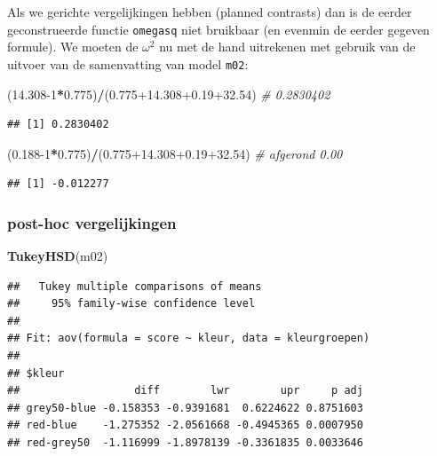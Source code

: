 \documentclass[
]{book}
\newenvironment{Shaded}{\begin{snugshade}}{\end{snugshade}}
\newcommand{\CommentTok}[1]{\textcolor[rgb]{0.56,0.35,0.01}{\textit{#1}}}
\newcommand{\DecValTok}[1]{\textcolor[rgb]{0.00,0.00,0.81}{#1}}
\newcommand{\FloatTok}[1]{\textcolor[rgb]{0.00,0.00,0.81}{#1}}
\newcommand{\KeywordTok}[1]{\textcolor[rgb]{0.13,0.29,0.53}{\textbf{#1}}}
\newcommand{\NormalTok}[1]{#1}
\newcommand{\OperatorTok}[1]{\textcolor[rgb]{0.81,0.36,0.00}{\textbf{#1}}}
\begin{document}
Als we gerichte vergelijkingen hebben (planned contrasts) dan is de eerder geconstrueerde functie \texttt{omegasq} niet bruikbaar (en evenmin de eerder gegeven formule). We moeten de \(\omega^2\) nu met de hand uitrekenen met gebruik van de uitvoer van de samenvatting van model \texttt{m02}:

\begin{Shaded}
\begin{Highlighting}[]
\NormalTok{(}\FloatTok{14.308}\DecValTok{{-}1}\OperatorTok{*}\FloatTok{0.775}\NormalTok{)}\OperatorTok{/}\NormalTok{(}\FloatTok{0.775+14.308+0.19+32.54}\NormalTok{) }\CommentTok{\# 0.2830402}
\end{Highlighting}
\end{Shaded}

\begin{verbatim}
## [1] 0.2830402
\end{verbatim}

\begin{Shaded}
\begin{Highlighting}[]
\NormalTok{(}\FloatTok{0.188}\DecValTok{{-}1}\OperatorTok{*}\FloatTok{0.775}\NormalTok{)}\OperatorTok{/}\NormalTok{(}\FloatTok{0.775+14.308+0.19+32.54}\NormalTok{) }\CommentTok{\# afgerond 0.00}
\end{Highlighting}
\end{Shaded}

\begin{verbatim}
## [1] -0.012277
\end{verbatim}

\hypertarget{post-hoc-vergelijkingen}{%
\subsubsection{post-hoc vergelijkingen}\label{post-hoc-vergelijkingen}}

\begin{Shaded}
\begin{Highlighting}[]
\KeywordTok{TukeyHSD}\NormalTok{(m02)}
\end{Highlighting}
\end{Shaded}

\begin{verbatim}
##   Tukey multiple comparisons of means
##     95% family-wise confidence level
## 
## Fit: aov(formula = score ~ kleur, data = kleurgroepen)
## 
## $kleur
##                  diff        lwr        upr     p adj
## grey50-blue -0.158353 -0.9391681  0.6224622 0.8751603
## red-blue    -1.275352 -2.0561668 -0.4945365 0.0007950
## red-grey50  -1.116999 -1.8978139 -0.3361835 0.0033646
\end{verbatim}
\end{document}
